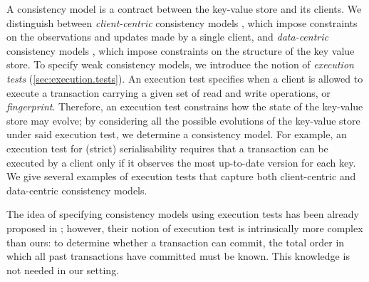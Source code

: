 A consistency model is a contract between the key-value store and its clients. We distinguish 
between \emph{client-centric} consistency models \cite{terry1994session}, 
which impose constraints on the observations and updates made by a single client, 
and \emph{data-centric} consistency models \cite{framework-concur}, which impose constraints 
on the structure of the key value store.
To specify weak consistency models, 
we introduce the notion of \emph{execution tests} (\cref{sec:execution.tests}). An execution test
 specifies when a client is allowed to execute a transaction carrying a given 
set of read and write operations, or \emph{fingerprint}. Therefore, an execution 
test constrains how the state of the key-value store may evolve;
by considering all the possible evolutions of the key-value store under said execution test, 
we determine a consistency model. For example, an execution test for (strict) serialisability 
requires that a transaction can be executed by a client only if it observes the most up-to-date 
version for each key. 
We give several examples of execution tests that capture both client-centric and 
data-centric consistency models. 

The idea of specifying consistency models using execution tests has been 
already proposed in \cite{seebelieve}; however, their notion of execution 
test is intrinsically more complex than ours: to determine 
whether a transaction can commit, the total order in which all past transactions 
have committed must be known. This knowledge is not needed in our setting.


